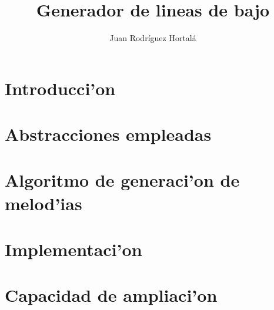 \documentclass[a4paper,12pt]{article}
\author{Juan Rodr\'iguez Hortal\'a}
\title{Generador de lineas de bajo}
\begin{document}
\maketitle
\tableofcontents
\section{Introducci'on}


\section{Abstracciones empleadas}

\section{Algoritmo de generaci'on de melod'ias}



\section{Implementaci'on}

\section {Capacidad de ampliaci'on}
\end{document}

